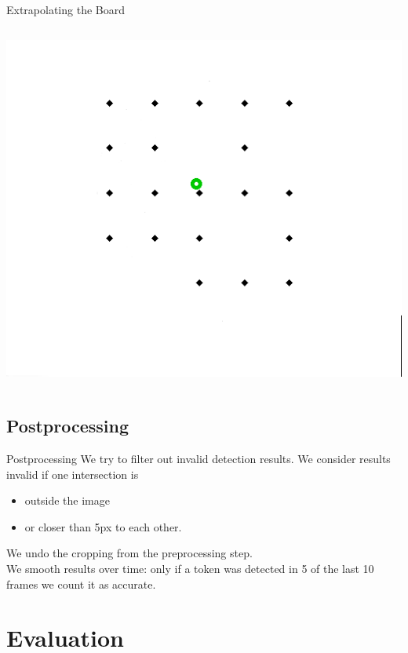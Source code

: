 \documentclass[table]{beamer}
\begin{document}
\begin{frame}{Extrapolating the Board}
\begin{columns}
\begin{column}{0.3\textwidth}
			\includegraphics[width=\columnwidth]{images/builtModel.png}
		\end{column}
	\end{columns}
\end{frame}
\subsection{Postprocessing}
\begin{frame}{Postprocessing}
	We try to filter out invalid detection results. We consider results invalid if one intersection is
	\begin{itemize}
		\item outside the image
		\item or closer than 5px to each other.
	\end{itemize}
	\vspace{0.5cm}

	We undo the cropping from the preprocessing step.\\[0.5cm]

	We smooth results over time: only if a token was detected in 5 of the last 10 frames we count it as accurate.
\end{frame}

\section{Evaluation}
\frame[squeeze]{\tableofcontents[currentsection]}
\end{document}
